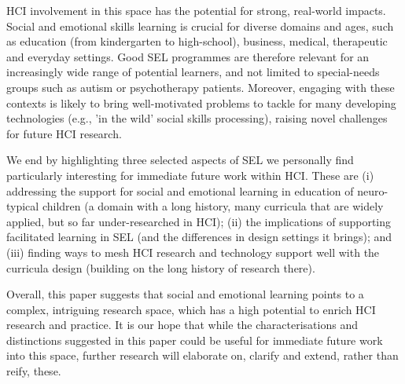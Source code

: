 \documentclass[prodmode,acmtochi]{acmsmall}
\newcommand{\todo}[1]{\textrm{\textrm{\textcolor{LightBlue}{[[#1]]}}}}
\begin{document}
HCI involvement in this space has the potential for strong, real-world impacts.
%
Social and emotional skills learning is crucial for diverse domains and ages, such as education (from kindergarten to high-school), business, medical, therapeutic and everyday settings. Good SEL programmes are therefore relevant for an increasingly wide range of potential learners, and not limited to special-needs groups such as autism or psychotherapy patients.
%
Moreover, engaging with these contexts is likely to bring well-motivated problems to tackle for many developing technologies (e.g., 'in the wild' social skills processing), raising novel challenges for future HCI research.


We end by highlighting three selected aspects of SEL we personally find particularly interesting for immediate future work within HCI. These are (i) addressing the support for social and emotional learning in education of neuro-typical children (a domain with a long history, many curricula that are widely applied, but so far under-researched in HCI); (ii) the implications of supporting facilitated learning in SEL (and the differences in design settings it brings); and (iii) finding ways to mesh HCI research and technology support well with the curricula design (building on the long history of research there).
%


Overall, this paper suggests that social and emotional learning points to a complex, intriguing research space, which has a high potential to enrich HCI research and practice.
%
It is our hope that while the characterisations and distinctions suggested in this paper could be useful for immediate future work into this space, further research will elaborate on, clarify and extend, rather than reify, these.
\end{document}
